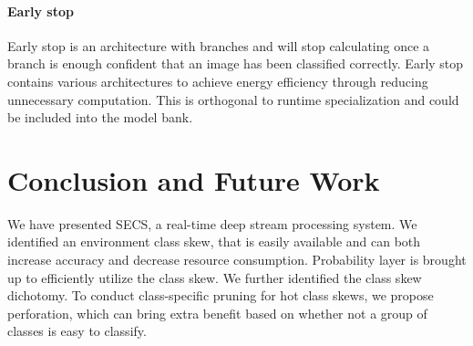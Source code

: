\documentclass[pageno]{jpaper}
\begin{document}
\paragraph{Early stop}
Early stop \cite{teerapittayanon2016branchynet, panda2016conditional} is an architecture with branches and will stop calculating once a branch is enough confident that an image has been classified correctly. Early stop contains various architectures to achieve energy efficiency through reducing unnecessary computation. This is orthogonal to runtime specialization and could be included into the model bank.

\section{Conclusion and Future Work} \label{conclusion}
We have presented SECS, a real-time deep stream processing system. We identified an environment class skew, that is easily available and can both increase accuracy and decrease resource consumption. Probability layer is brought up to efficiently utilize the class skew. We further identified the class skew dichotomy. To conduct class-specific pruning for hot class skews, we propose perforation, which can bring extra benefit based on whether not a group of classes is easy to classify.


\newpage
\clearpage





\end{document}
